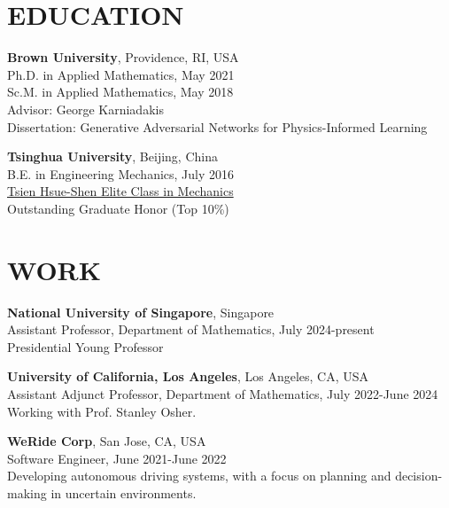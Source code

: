\documentclass[margin]{resphoto}
\begin{document}
\begin{resume}

\section{EDUCATION}

\textbf{Brown University}, Providence, RI, USA\\
Ph.D. in Applied Mathematics, May 2021\\
Sc.M. in Applied Mathematics, May 2018\\
Advisor: George Karniadakis\\
Dissertation: Generative Adversarial Networks for Physics-Informed Learning

\textbf{Tsinghua University}, Beijing, China\\
B.E. in Engineering Mechanics, July 2016\\
\href{https://www.hy.tsinghua.edu.cn/hyen/info/1176/1065.htm}{Tsien Hsue-Shen Elite Class in Mechanics}\\
Outstanding Graduate Honor (Top 10\%)


\section{WORK}
\textbf{National University of Singapore}, Singapore\\
Assistant Professor, Department of Mathematics, July 2024-present
\\Presidential Young Professor

\textbf{University of California, Los Angeles}, Los Angeles, CA, USA\\
Assistant Adjunct Professor, Department of Mathematics, July 2022-June 2024
\\Working with Prof. Stanley Osher.

\textbf{WeRide Corp}, San Jose, CA, USA\\
Software Engineer, June 2021-June 2022
\\Developing autonomous driving systems, with a focus on planning and decision-making in uncertain environments.




\end{resume}
\end{document}
